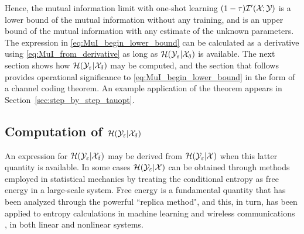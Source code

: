 \documentclass[12pt, draftclsnofoot,journal,onecolumn]{IEEEtran}
\begin{document}
Hence, the mutual information limit with one-shot learning $(1-\tau)\mathcal{I}{'}({\mathcal{X}}_{};{\mathcal{Y}}_{})$ is a lower bound of the mutual information without any training, and is an upper bound of the mutual information with any estimate of the unknown parameters.  The expression in \eqref{eq:MuI_begin_lower_bound} can be calculated as a derivative using \eqref{eq:MuI_from_derivative} as long as $\mathcal{H}(\mathcal{Y}_\varepsilon|\mathcal{X}_\delta)$ is available.
The next section shows how $\mathcal{H}(\mathcal{Y}_\varepsilon|\mathcal{X}_\delta)$ may be computed, and the section that follows provides operational significance to \eqref{eq:MuI_begin_lower_bound} in the form of a channel coding theorem.  An example application of the theorem appears in Section~\ref{sec:step_by_step_tauopt}.

\subsection{Computation of $\mathcal{H}(\mathcal{Y}_\varepsilon|\mathcal{X}_\delta)$}

An expression for $\mathcal{H}(\mathcal{Y}_\varepsilon|\mathcal{X}_\delta)$ may be derived from $\mathcal{H}(\mathcal{Y}_\varepsilon|\mathcal{X})$ when this latter quantity is available.  In some cases $\mathcal{H}(\mathcal{Y}_\varepsilon|\mathcal{X})$ can be obtained through methods employed in statistical mechanics by treating the conditional entropy as free energy in a large-scale system.  Free energy is a fundamental quantity \cite{castellani2005spin,mezard2009information} that has been analyzed through the powerful ``replica method", and this, in turn, has been applied to entropy calculations in 
machine learning \cite{engel2001statistical,opper1996statistical,shinzato2008learning,ha1993generalization} and wireless communications \cite{wen2015performance,wen2015joint,wen2016bayes}, in both linear and nonlinear systems.  
\end{document}
